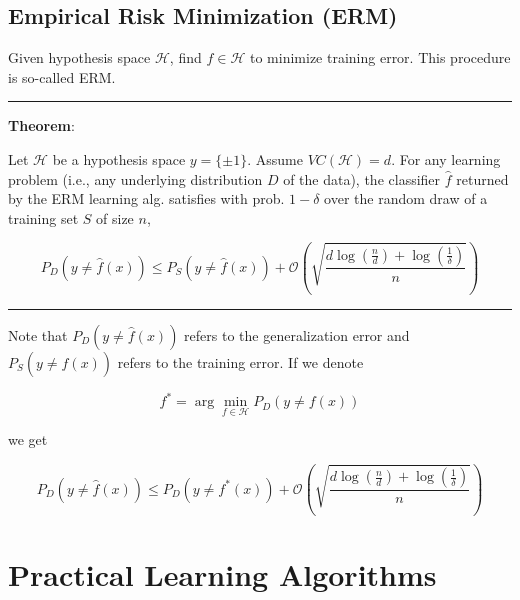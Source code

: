 \documentclass[UTF8]{article}
\begin{document}
\subsection{Empirical Risk Minimization (ERM)}
Given hypothesis space $\mathcal{H}$, find $f\in\mathcal{H}$ to minimize training error. This procedure is so-called ERM.\\
\rule{\textwidth}{0.5pt}\par
\textbf{Theorem}:\par
Let $\mathcal{H}$ be a hypothesis space $y=\{\pm 1\}$. Assume $VC(\mathcal{H})=d$. For any learning problem (i.e., any underlying distribution $D$ of the data), the classifier $\hat{f}$ returned by the ERM learning alg. satisfies with prob. $1-\delta$ over the random draw of a training set $S$ of size $n$,\par
\begin{equation*}
P_{D}(y\neq \hat{f}(x))\leq P_{S}(y\neq \hat{f}(x))+\mathcal{O}\left(\sqrt{\frac{d\log(\frac{n}{d})+\log(\frac{1}{\delta})}{n}}\right)
\end{equation*}
\rule{\textwidth}{0.5pt}\par
\vspace{9pt}
Note that $P_{D}(y\neq \hat{f}(x))$ refers to the generalization error and $P_{S}(y\neq \hat{f}(x))$ refers to the training error. If we denote\par
\begin{equation*}
f^{*}=\arg\!\min_{f\in\mathcal{H}}P_{D}(y\neq f(x))
\end{equation*}\par
we get\par
\begin{equation*}
P_{D}(y\neq \hat{f}(x))\leq P_{D}(y\neq f^{*}(x))+\mathcal{O}\left(\sqrt{\frac{d\log(\frac{n}{d})+\log(\frac{1}{\delta})}{n}}\right)
\end{equation*}\par
\section{Practical Learning Algorithms}
\end{document}
